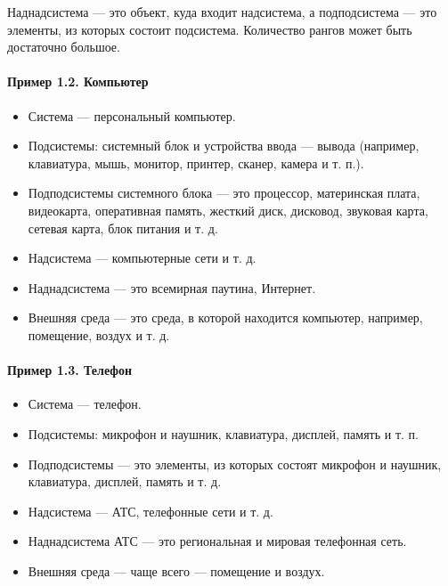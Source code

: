 \documentclass[11pt,a4paper]{article}
\begin{document}
Наднадсистема — это объект, куда входит надсистема, а подподсистема — это
элементы, из которых состоит подсистема. Количество рангов может быть
достаточно большое.

\paragraph{Пример 1.2. Компьютер}
\begin{itemize}[noitemsep]
\item Система — персональный компьютер.
\item Подсистемы: системный блок и устройства ввода — вывода (например,
  клавиатура, мышь, монитор, принтер, сканер, камера и т. п.).
\item Подподсистемы системного блока — это процессор, материнская плата,
  видеокарта, оперативная память, жесткий диск, дисковод, звуковая карта,
  сетевая карта, блок питания и т. д.
\item Надсистема — компьютерные сети и т. д.
\item Наднадсистема — это всемирная паутина, Интернет.
\item Внешняя среда — это среда, в которой находится компьютер, например,
  помещение, воздух и т. д.
\end{itemize}

\paragraph{Пример 1.3. Телефон}
\begin{itemize}[noitemsep]
\item Система — телефон.
\item Подсистемы: микрофон и наушник, клавиатура, дисплей, память и т. п.
\item Подподсистемы — это элементы, из которых состоят микрофон и наушник,
  клавиатура, дисплей, память и т. д.
\item Надсистема — АТС, телефонные сети и т. д.
\item Наднадсистема АТС — это региональная и мировая телефонная сеть.
\item Внешняя среда — чаще всего — помещение и воздух.
\end{itemize}
\end{document}
